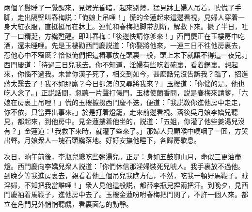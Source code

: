 兩個丫鬟睡了一覺醒來，見燈光昏暗，起來剔燈，猛見牀上婦人吊着，唬慌了手脚，走出隔壁叫春梅説：「俺娘上吊哩！」慌的金蓮起來這邊看視，見婦人穿着一身大紅衣服，直挺挺吊在牀上。連忙和春梅把脚带割断，解救下來。撅了半日，吐了一口精涎，方纔甦醒。即叫春梅：「後邊快請你爹來！」西門慶正在玉樓房中吃酒，還未睡哩。先是玉樓勸西門慶説道：「你娶將他來，一連三日不徃他房裏去，惹他心中不窄麽？恰似俺們把這樁事放在頭裏一般，頭上末下就讓不得這一夜兒。」西門慶道：「待過三日兒我去。你不知道，淫婦有些吃着碗裏，看着鍋裏。想起來，你惱不過我。未曾你漢子死了，相交到如今，甚麽話兒沒告訴我？臨了，招進蔣太醫去了！我不如那廝？今日卻怎的又尋將我來？」玉樓道：「你惱的是。他也吃人念了。」正説話間，忽聽一片聲打儀門。玉樓使蘭香問，説是春梅來請爹，「六娘在房裏上吊哩！」慌的玉樓攛掇西門慶不迭，便道：「我説敎你進他房中走走，你不依，只當弄出事來。」於是打着燈籠，走來前邊看視。落後吳月娘李嬌兒聽見，都起來，到他房中。見金蓮摟着他坐的，説道：「五姐，你灌了他些姜湯兒沒有？」金蓮道：「我救下來時，就灌了些來了。」那婦人只顧喉中哽咽了一囬，方哭出聲。月娘衆人一塊石頭纔落地。好好安撫他睡下，各歸房歇息。

次日，晌午前後，李瓶兒纔吃些粥湯兒。正是：身如五鼓啣山月，命似三更油盡燈。西門慶向李嬌兒衆人説道：「你們休信那淫婦裝死兒唬人。我手裏放不過他。到晚夕等我進房裏去，親看着他上個吊兒我瞧方信，不然，吃我一頓好馬鞭子。賊淫婦，不知把我當誰哩！」衆人見他這般説，都替李瓶兒捏兩把汗。到晚夕，見西門慶袖着馬鞭子，進他房中去了。玉樓金蓮吩咐春梅把門関了，不許一個人來。都立在角門兒外悄悄聽覷，看裏面怎的動靜。

